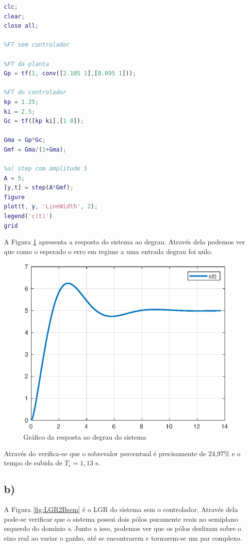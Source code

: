    \begin{lstlisting}[language=Matlab,label=Q2A,caption=Análise da estabilidade]
clc;
clear;
close all;

%FT sem controlador

%FT da planta
Gp = tf(1, conv([2.105 1],[0.095 1]));

%FT do controlador
kp = 1.25;
ki = 2.5;
Gc = tf([kp ki],[1 0]);

Gma = Gp*Gc;
Gmf = Gma/(1+Gma);

%a) step com amplitude 5
A = 5;
[y,t] = step(A*Gmf);
figure
plot(t, y, 'LineWidth', 2);
legend('c(t)')
grid
    \end{lstlisting}

    A Figura \ref{fig:Q2A} apresenta a resposta do sistema ao degrau. Através dela podemos ver que como o esperado o erro em
    regime a uma entrada degrau foi nulo.

    \begin{figure}[!ht]
        \centering
        \includegraphics[width = 0.75\linewidth]{Figuras/ProblemasPI/Problema2/step.eps}
        \caption{Gráfico da resposta ao degrau do sistema}
        \label{fig:Q2A}                   
    \end{figure}

    Através do  verifica-se que o sobrevalor percentual é precisamente de 24,97\% e o tempo
    de subida de $T_r =1,13 \text{ s} $. 

\clearpage 
\newpage

\subsection*{b) }

    A Figura \ref{fig:LGR2Bsem} é o LGR do sistema sem o controlador. Através dela pode-se verificar que
    o sistema possui dois pólos puramente reais no semiplano esquerdo do domínio \textit{s}. Junto a isso,
    podemos ver que os pólos deslizam sobre o eixo real ao variar o ganho, até se encontrarem e 
    tornarem-se um par complexo.
    
